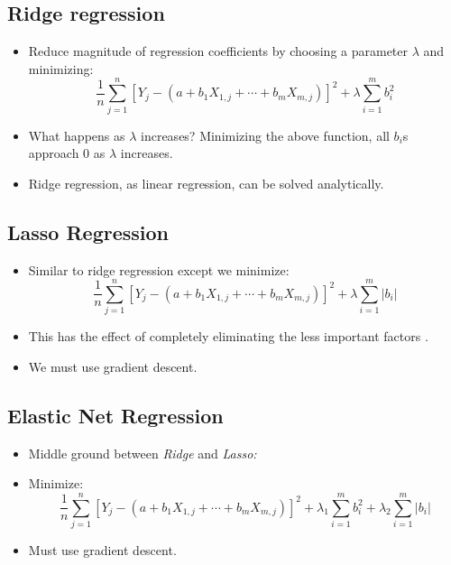 \subsection{Ridge regression}

\begin{itemize}
    \item Reduce magnitude of regression coefficients by choosing a parameter $\lambda $ and minimizing:
    \begin{equation*}
        \frac{1}{n}\sum\limits _{j=1}^{n}\left[ Y_{j} -\left(a+b_{1} X_{1,j} +\cdots +b_{m} X_{m,j}\right)\right]^{2} +\lambda \sum _{i=1}^{m} b_{i}^{2}
    \end{equation*}
    \item What happens as $\lambda $ increases? Minimizing the above function, all $b_{i}$s approach 0 as $\lambda $ increases.
    \item Ridge regression, as linear regression, can be solved analytically.
\end{itemize}

\subsection{Lasso Regression}

\begin{itemize}
    \item Similar to ridge regression except we minimize:
    \begin{equation*}
        \frac{1}{n}\sum\limits _{j=1}^{n}\left[ Y_{j} -\left(a+b_{1} X_{1,j} +\cdots +b_{m} X_{m,j}\right)\right]^{2} +\lambda \sum _{i=1}^{m}\left| b_{i}\right| 
    \end{equation*}
    \item This has the effect of completely eliminating the less important factors .
    \item We must use gradient descent.
\end{itemize}

\subsection{Elastic Net Regression}

\begin{itemize}
    \item Middle ground between \textit{Ridge} and \textit{Lasso:}
    \item Minimize:
    \begin{equation*}
        \frac{1}{n}\sum\limits _{j=1}^{n}[ Y_{j} -(a+b_{1} X_{1,j} +\cdots +b_{m} X_{m,j})]^{2} +\lambda _{1}\sum _{i=1}^{m} b_{i}^{2} +\lambda _{2}\sum _{i=1}^{m}| b_{i}| 
    \end{equation*}
    \item Must use gradient descent.
\end{itemize}

